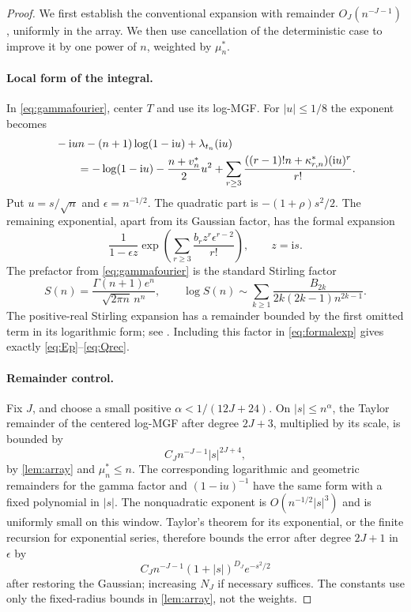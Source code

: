 \documentclass[11pt,a4paper]{article}
\numberwithin{equation}{section}
\theoremstyle{definition}\newtheorem{definition}[theorem]{Definition}
\theoremstyle{remark}\newtheorem{remark}[theorem]{Remark}
\newcommand{\ii}{\mathrm i}
\begin{document}
\begin{proof}
We first establish the conventional expansion with remainder $O_J(n^{-J-1})$, uniformly in the array. We then use cancellation of the deterministic case to improve it by one power of $n$, weighted by $\mu_n^*$.

\paragraph{Local form of the integral.}
In \eqref{eq:gammafourier}, center $T$ and use its log-MGF. For $|u|\le1/8$ the exponent becomes
\begin{align}\label{eq:localexponent}
 &-\ii un-(n+1)\log(1-\ii u)+\lambda_{t_n}(\ii u)\notag\\
 &\qquad=-\log(1-\ii u)-\frac{n+v_n^*}{2}u^2
   +\sum_{r\ge3}\frac{((r-1)!n+\kappa_{r,n}^*)(\ii u)^r}{r!}.
\end{align}
Put $u=s/\sqrt n$ and $\epsilon=n^{-1/2}$. The quadratic part is
$-(1+\rho)s^2/2$. The remaining exponential, apart from its Gaussian factor, has the formal expansion
\begin{equation}\label{eq:formalexp}
 \frac1{1-\epsilon z}
 \exp\!\left(\sum_{r\ge3}\frac{b_rz^r\epsilon^{r-2}}{r!}\right),
 \qquad z=\ii s.
\end{equation}
The prefactor from \eqref{eq:gammafourier} is the standard Stirling factor
\[
 S(n)=\frac{\Gamma(n+1)e^n}{\sqrt{2\pi n}\,n^n},
 \qquad
 \log S(n)\sim\sum_{k\ge1}\frac{B_{2k}}{2k(2k-1)n^{2k-1}}.
\]
The positive-real Stirling expansion has a remainder bounded by the first omitted term in its logarithmic form; see \cite[\S5.11]{dlmf}. Including this factor in \eqref{eq:formalexp} gives exactly \eqref{eq:Ep}--\eqref{eq:Qrec}.

\paragraph{Remainder control.}
Fix $J$, and choose a small positive $\alpha<1/(12J+24)$. On $|s|\le n^\alpha$, the Taylor remainder of the centered log-MGF after degree $2J+3$, multiplied by its scale, is bounded by
\[
 C_J n^{-J-1}|s|^{2J+4},
\]
by \cref{lem:array} and $\mu_n^*\le n$. The corresponding logarithmic and geometric remainders for the gamma factor and $(1-\ii u)^{-1}$ have the same form with a fixed polynomial in $|s|$. The nonquadratic exponent is $O(n^{-1/2}|s|^3)$ and is uniformly small on this window. Taylor's theorem for its exponential, or the finite recursion for exponential series, therefore bounds the error after degree $2J+1$ in $\epsilon$ by
\[
 C_J n^{-J-1}(1+|s|)^{D_J}e^{-s^2/2}
\]
after restoring the Gaussian; increasing $N_J$ if necessary suffices. The constants use only the fixed-radius bounds in \cref{lem:array}, not the weights.


\end{proof}
\end{document}
